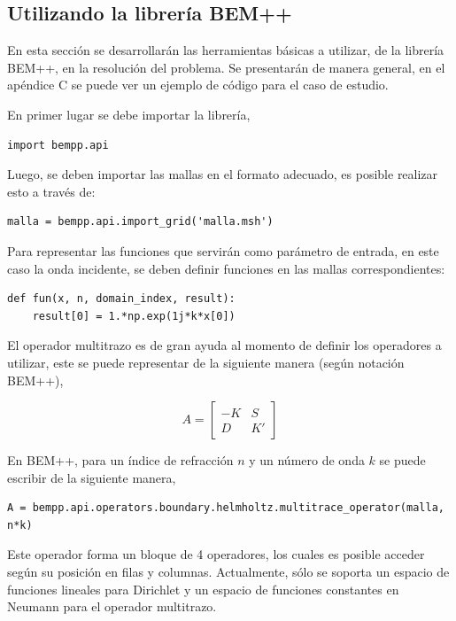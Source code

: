 \documentclass[12pt,letterpaper]{article}
\numberwithin{equation}{section}
\begin{document}
\subsection{Utilizando la librería BEM++}
En esta sección se desarrollarán las herramientas básicas a utilizar, de la librería BEM++, en la resolución del problema. Se presentarán de manera general, en el apéndice C se puede ver un ejemplo de código para el caso de estudio.

En primer lugar se debe importar la librería,

\begin{lstlisting}
import bempp.api
\end{lstlisting}

Luego, se deben importar las mallas en el formato adecuado, es posible realizar esto a través de:

\begin{lstlisting}
malla = bempp.api.import_grid('malla.msh')
\end{lstlisting}

Para representar las funciones que servirán como parámetro de entrada, en este caso la onda incidente, se deben definir funciones en las mallas correspondientes:

\begin{lstlisting}
def fun(x, n, domain_index, result):
	result[0] = 1.*np.exp(1j*k*x[0])
\end{lstlisting}

El operador multitrazo es de gran ayuda al momento de definir los operadores a utilizar, este se puede representar de la siguiente manera (según notación BEM++),

$$
A =
	\begin{bmatrix}
		-K & S\\
		D & K'
	\end{bmatrix}
$$

\pagebreak
En BEM++, para un índice de refracción $n$ y un número de onda $k$ se puede escribir de la siguiente manera,

\begin{lstlisting}
A = bempp.api.operators.boundary.helmholtz.multitrace_operator(malla, n*k)
\end{lstlisting}

Este operador forma un bloque de 4 operadores, los cuales es posible acceder según su posición en filas y columnas. Actualmente, sólo se soporta un espacio de funciones lineales para Dirichlet y un espacio de funciones constantes en Neumann para el operador multitrazo. 
\end{document}
